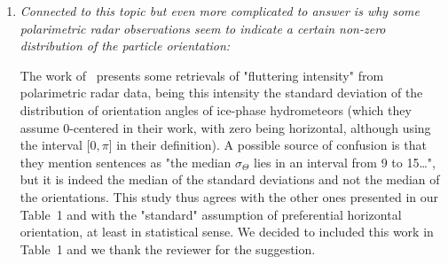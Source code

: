 \documentclass[12pt]{article}
\begin{document}
\begin{enumerate}
    \item \textit{Connected to this topic but even more complicated to answer is why some polarimetric radar observations seem to indicate a certain non-zero distribution of the particle orientation: \cite{Melnikov_JAOT_2013}}

    The work of~\cite{Melnikov_JAOT_2013} presents some retrievals of "fluttering intensity" from polarimetric radar data, being this intensity the standard deviation of the  distribution of orientation angles of ice-phase hydrometeors (which they assume  0-centered in their work, with zero being horizontal, although using the interval [$0,\pi$] in their definition). A possible source of confusion is that they mention sentences as "the median $\sigma_{\Theta}$ lies in an interval from 9 to 15\dots", but it is indeed the median of the standard deviations and not the median of the orientations. This study thus agrees with the other ones presented in our Table~1 and with the "standard" assumption of preferential horizontal orientation, at least in statistical sense. We decided to included this work in Table~1 and we thank the reviewer for the suggestion.    
    
\end{enumerate}



\end{document}
